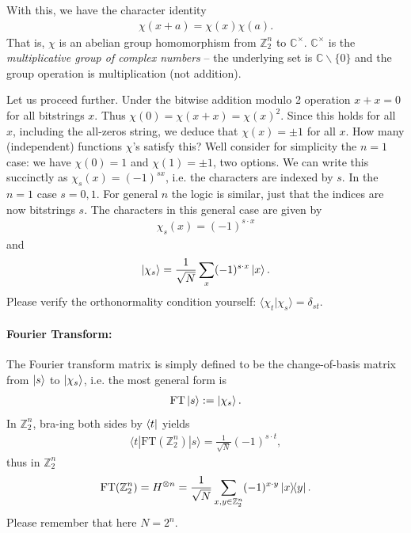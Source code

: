 With this, we have the character identity
\begin{align*}
    \chi(x+a) = \chi(x)\chi(a).
\end{align*}
That is, $\chi$ is an abelian group homomorphism from $\mathbb{Z}_2^n$ to $\mathbb{C}^\times$. $\mathbb{C}^\times$ is the \textit{multiplicative group of complex numbers} -- the underlying set is $\mathbb{C}\backslash\{0\}$ and the group operation is multiplication (not addition).

Let us proceed further. Under the bitwise addition modulo 2 operation $x+x=0$ for all bitstrings $x$. Thus $\chi(0) = \chi(x+x) = \chi(x)^2$. Since this holds for all $x$, including the all-zeros string, we deduce that $\chi(x)=\pm 1$ for all $x$. How many (independent) functions $\chi$'s satisfy this? Well consider for simplicity the $n=1$ case: we have $\chi(0)=1$ and $\chi(1)=\pm1$, two options. We can write this succinctly as $\chi_s(x)=(-1)^{sx}$, i.e. the characters are indexed by $s$. In the $n=1$ case $s=0,1$. For general $n$ the logic is similar, just that the indices are now bitstrings $s$. The characters in this general case are given by
\begin{align*}
    \chi_s(x) = (-1)^{s \cdot x}
\end{align*}
and
\begin{align*}
    \ket{\chi_s} = \frac{1}{\sqrt{N}}\sum_x (-1)^{s \cdot x}\ket{x}.
\end{align*}
Please verify the orthonormality condition yourself: $\langle \chi_t|\chi_s \rangle = \delta_{st}$.

\paragraph{Fourier Transform:} The Fourier transform matrix is simply defined to be the change-of-basis matrix from $\ket{s}$ to $\ket{\chi_s}$, i.e. the most general form is
\begin{align*}
    \text{FT}\ket{s} := \ket{\chi_s}.
\end{align*}
In $\mathbb{Z}_2^n$, bra-ing both sides by $\bra{t}$ yields
\begin{align*}
    \langle t|\text{FT}(\mathbb{Z}_2^n)|s \rangle = \frac{1}{\sqrt{N}} (-1)^{s \cdot t}, 
\end{align*}
thus in $\mathbb{Z}_2^n$
\begin{align*}
    \text{FT}(\mathbb{Z}_2^n) = H^{\otimes n} = \frac{1}{\sqrt{N}} \sum_{x,y \in \mathbb{Z}_2^n} (-1)^{x \cdot y} \ketbra{x}{y}.
\end{align*}
Please remember that here $N=2^n$.

